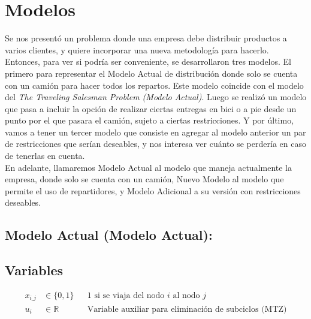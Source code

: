 \documentclass{article}
\begin{document}


\maketitle

\newpage

\section{Modelos}
Se nos presentó un problema donde una empresa debe distribuir productos a varios clientes, y quiere incorporar una nueva metodología para hacerlo. Entonces, para ver si podría ser conveniente, se desarrollaron tres modelos. El primero para representar el Modelo Actual de distribución donde solo se cuenta con un camión para hacer todos los repartos. Este modelo coincide con el modelo del \textit{The Traveling Salesman Problem (Modelo Actual)}. Luego se realizó un modelo que pasa a incluir la opción de realizar ciertas entregas en bici o a pie desde un punto por el que pasara el camión, sujeto a ciertas restricciones. Y por último, vamos a tener un tercer modelo que consiste en agregar al modelo anterior un par de restricciones que serían deseables, y nos interesa ver cuánto se perdería en caso de tenerlas en cuenta. \\
En adelante, llamaremos Modelo Actual al modelo que maneja actualmente la empresa, donde solo se cuenta con un camión, Nuevo Modelo al modelo que permite el uso de repartidores, y Modelo Adicional a su versión con restricciones deseables.

\subsection{Modelo Actual (Modelo Actual):} \label{modelo_actual}
\subsection*{Variables}
\begin{align*}
    x_{i\_j} &\in \{0,1\} && \text{1 si se viaja del nodo } i \text{ al nodo } j \\
    u_i &\in \mathbb{R} && \text{Variable auxiliar para eliminación de subciclos (MTZ)}
\end{align*}
\end{document}
